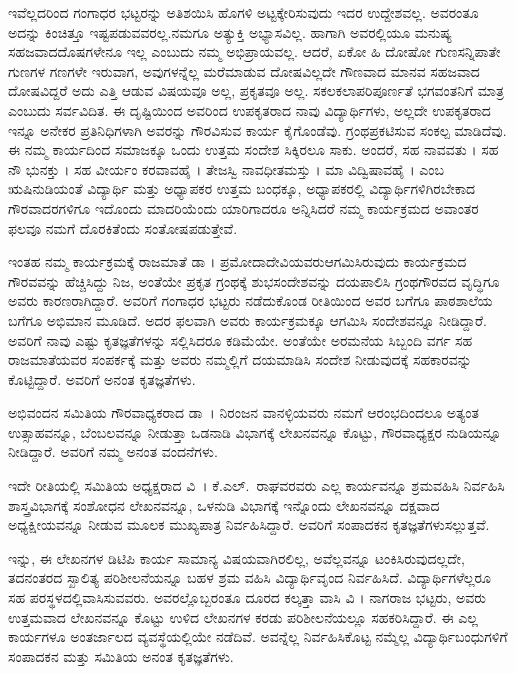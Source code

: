 {ಇವೆಲ್ಲದರಿಂದ ಗಂಗಾಧರ ಭಟ್ಟರನ್ನು ಅತಿಶಯಿಸಿ ಹೊಗಳಿ \hbox{ಅಟ್ಟಕ್ಕೇರಿಸುವುದು} ಇದರ ಉದ್ದೇಶವಲ್ಲ. ಅವರಂತೂ ಅದನ್ನು ಕಿಂಚಿತ್ತೂ ಇಷ್ಟಪಡುವವರಲ್ಲ.\break ನಮಗೂ ಅತ್ಯುಕ್ತಿ ಅಭ್ಯಾಸವಿಲ್ಲ. ಹಾಗಾಗಿ ಅವರಲ್ಲಿಯೂ ಮನುಷ್ಯ ಸಹಜವಾದ\break ದೊಷಗಳೇನೂ ಇಲ್ಲ ಎಂಬುದು ನಮ್ಮ ಅಭಿಪ್ರಾಯವಲ್ಲ. ಆದರೆ, ಏಕೋ ಹಿ \hbox{ದೋಷೋ} ಗುಣಸನ್ನಿಪಾತೇ \enginline{-} ಗುಣಗಳ ಗಣಗಳೇ ಇರುವಾಗ, ಅವುಗಳನ್ನೆಲ್ಲ ಮರೆ\-ಮಾಡುವ ದೋಷವಿಲ್ಲದೇ ಗೌಣವಾದ ಮಾನವ ಸಹಜವಾದ ದೋಷವಿದ್ದರೆ ಅದು ಎತ್ತಿ ಆಡುವ ವಿಷಯವೂ ಅಲ್ಲ, ಪ್ರಕೃತವೂ ಅಲ್ಲ. ಸಕಲಕಲಾಪರಿಪೂರ್ಣತೆ ಭಗವಂತನಿಗೆ ಮಾತ್ರ  ಎಂಬುದು ಸರ್ವವಿದಿತ. ಈ ದೃಷ್ಟಿಯಿಂದ ಅವರಿಂದ ಉಪಕೃತರಾದ ನಾವು \enginline{-} ವಿದ್ಯಾರ್ಥಿಗಳು, ಅಲ್ಲದೇ ಉಪಕೃತರಾದ ಇನ್ನೂ ಅನೇಕರ ಪ್ರತಿನಿಧಿಗಳಾಗಿ ಅವರನ್ನು ಗೌರವಿಸುವ ಕಾರ್ಯ ಕೈಗೊಂಡೆವು. ಗ್ರಂಥಪ್ರಕಟಿಸುವ ಸಂಕಲ್ಪ ಮಾಡಿದೆವು. ಈ ನಮ್ಮ ಕಾರ್ಯದಿಂದ ಸಮಾಜಕ್ಕೂ ಒಂದು  ಉತ್ತಮ ಸಂದೇಶ ಸಿಕ್ಕಿರಲೂ ಸಾಕು. ಅಂದರೆ, ಸಹ ನಾವವತು  । ಸಹ ನೌ ಭುನಕ್ತು  । ಸಹ ವೀರ್ಯಂ ಕರವಾವಹೈ  । ತೇಜಸ್ವಿ  ನಾವಧೀತಮಸ್ತು  । ಮಾ ವಿದ್ವಿಷಾವಹೈ  । ಎಂಬ ಋಷಿನುಡಿಯಂತೆ ವಿದ್ಯಾರ್ಥಿ ಮತ್ತು ಅಧ್ಯಾಪಕರ ಉತ್ತಮ ಬಂಧಕ್ಕೂ, ಅಧ್ಯಾಪಕರಲ್ಲಿ ವಿದ್ಯಾರ್ಥಿಗಳಿಗಿರಬೇಕಾದ ಗೌರವಾದರಗಳಿಗೂ ಇದೊಂದು ಮಾದರಿಯೆಂದು ಯಾರಿಗಾದರೂ ಅನ್ನಿಸಿದರೆ ನಮ್ಮ ಕಾರ್ಯಕ್ರಮದ ಅವಾಂತರ ಫಲವೂ ನಮಗೆ ದೊರಕಿತೆಂದು ಸಂತೋಷಪಡುತ್ತೇವೆ.

ಇಂತಹ ನಮ್ಮ ಕಾರ್ಯಕ್ರಮಕ್ಕೆ ರಾಜಮಾತೆ ಡಾ  । ಪ್ರಮೋದಾದೇವಿಯವರು\break ಆಗಮಿಸಿರುವುದು ಕಾರ್ಯಕ್ರಮದ ಗೌರವವನ್ನು ಹೆಚ್ಚಿಸಿದ್ದು ನಿಜ, ಅಂತೆಯೇ ಪ್ರಕೃತ ಗ್ರಂಥಕ್ಕೆ ಶುಭಸಂದೇಶವನ್ನು ದಯಪಾಲಿಸಿ ಗ್ರಂಥಗೌರವದ ವೃದ್ಧಿಗೂ ಅವರು ಕಾರಣರಾಗಿದ್ದಾರೆ. ಅವರಿಗೆ ಗಂಗಾಧರ ಭಟ್ಟರು ನಡೆದುಕೊಂಡ ರೀತಿಯಿಂದ ಅವರ ಬಗೆಗೂ ಪಾಠಶಾಲೆಯ ಬಗೆಗೂ  ಅಭಿಮಾನ ಮೂಡಿದೆ. ಅದರ ಫಲವಾಗಿ ಅವರು ಕಾರ್ಯ\-ಕ್ರಮಕ್ಕೂ ಆಗಮಿಸಿ ಸಂದೇಶವನ್ನೂ ನೀಡಿದ್ದಾರೆ. ಅವರಿಗೆ ನಾವು ಎಷ್ಟು ಕೃತಜ್ಞತೆಗಳನ್ನು ಸಲ್ಲಿಸಿದರೂ ಕಡಿಮೆಯೇ. ಅಂತೆಯೇ ಅರಮನೆಯ ಸಿಬ್ಬಂದಿ ವರ್ಗ ಸಹ ರಾಜಮಾತೆಯವರ ಸಂಪರ್ಕಕ್ಕೆ ಮತ್ತು ಅವರು ನಮ್ಮಲ್ಲಿಗೆ ದಯಮಾಡಿಸಿ ಸಂದೇಶ ನೀಡುವುದಕ್ಕೆ ಸಹಕಾರವನ್ನು ಕೊಟ್ಟಿದ್ದಾರೆ. ಅವರಿಗೆ ಅನಂತ ಕೃತಜ್ಞತೆಗಳು.

ಅಭಿವಂದನ ಸಮಿತಿಯ ಗೌರವಾಧ್ಯಕರಾದ ಡಾ~। ನಿರಂಜನ \hbox{ವಾನಳ್ಳಿಯವರು} ನಮಗೆ ಆರಂಭದಿಂದಲೂ ಅತ್ಯಂತ ಉತ್ಸಾಹವನ್ನೂ, ಬೆಂಬಲವನ್ನೂ ನೀಡುತ್ತಾ \hbox{ಒಡನಾಡಿ} ವಿಭಾಗಕ್ಕೆ ಲೇಖನವನ್ನೂ ಕೊಟ್ಟು, ಗೌರವಾಧ್ಯಕ್ಷರ ನುಡಿಯನ್ನೂ ನೀಡಿದ್ದಾರೆ. ಅವರಿಗೆ ನಮ್ಮ ಅನಂತ ವಂದನೆಗಳು.

ಇದೇ ರೀತಿಯಲ್ಲಿ ಸಮಿತಿಯ ಅಧ್ಯಕ್ಷರಾದ ವಿ~। ಕೆ.ಎಲ್.\ ರಾಘವರವರು ಎಲ್ಲ ಕಾರ್ಯವನ್ನೂ ಶ್ರಮವಹಿಸಿ ನಿರ್ವಹಿಸಿ ಶಾಸ್ತ್ರವಿಭಾಗಕ್ಕೆ ಸಂಶೋಧನ \hbox{ಲೇಖನವನ್ನೂ,} ಒಳನುಡಿ ವಿಭಾಗಕ್ಕೆ ಇನ್ನೊಂದು ಲೇಖನವನ್ನೂ ದಕ್ಷವಾದ ಅಧ್ಯಕ್ಷೀಯವನ್ನೂ ನೀಡುವ ಮೂಲಕ ಮುಖ್ಯಪಾತ್ರ ನಿರ್ವಹಿಸಿದ್ದಾರೆ. ಅವರಿಗೆ ಸಂಪಾದಕನ ಕೃತಜ್ಞತೆಗಳು\break ಸಲ್ಲುತ್ತವೆ.

ಇನ್ನು, ಈ ಲೇಖನಗಳ ಡಿಟಿಪಿ ಕಾರ್ಯ ಸಾಮಾನ್ಯ ವಿಷಯವಾಗಿರಲಿಲ್ಲ, ಅವೆಲ್ಲ\-ವನ್ನೂ ಟಂಕಿಸಿರುವುದಲ್ಲದೇ, ತದನಂತರದ ಸ್ಖಾಲಿತ್ಯ ಪರಿಶೀಲನೆಯನ್ನೂ ಬಹಳ ಶ್ರಮ ವಹಿಸಿ ವಿದ್ಯಾರ್ಥಿವೃಂದ ನಿರ್ವಹಿಸಿದೆ. ವಿದ್ಯಾರ್ಥಿಗಳೆಲ್ಲರೂ ಸಹ ಪರಸ್ಥಳದಲ್ಲಿ\break ವಾಸಿಸುವವರು. ಅವರಲ್ಲೊಬ್ಬರಂತೂ ದೂರದ ಕಲ್ಕತ್ತಾ ವಾಸಿ \enginline{-} ವಿ  । ನಾಗರಾಜ ಭಟ್ಟರು, ಅವರು ಉತ್ತಮವಾದ ಲೇಖನವನ್ನೂ ಕೊಟ್ಟು ಉಳಿದ ಲೇಖನಗಳ ಕರಡು ಪರಿಶೀಲನೆಯಲ್ಲೂ ಸಹಕರಿಸಿದ್ದಾರೆ. ಈ ಎಲ್ಲ ಕಾರ್ಯಗಳೂ ಅಂತರ್ಜಾಲದ ವ್ಯವಸ್ಥೆಯಲ್ಲಿಯೇ ನಡೆದಿವೆ. ಅವನ್ನೆಲ್ಲ ನಿರ್ವಹಿಸಿಕೊಟ್ಟ ನಮ್ಮೆಲ್ಲ ವಿದ್ಯಾರ್ಥಿಬಂಧುಗಳಿಗೆ ಸಂಪಾದಕನ ಮತ್ತು ಸಮಿತಿಯ ಅನಂತ ಕೃತಜ್ಞತೆಗಳು. 

}
